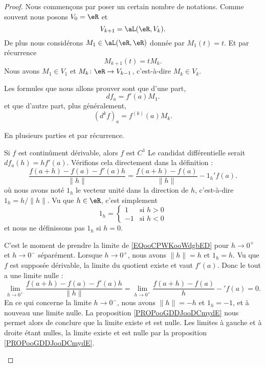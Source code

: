 \begin{proof}
    Nous commençons par poser un certain nombre de notations. Comme souvent nous posons \( V_0=\eR\) et
    \begin{equation}
        V_{k+1}=\aL(\eR,V_k).
    \end{equation}
    De plus nous considérons \( M_1\in \aL(\eR,\eR)\) donnée par \( M_1(t)=t\). Et par récurrence
    \begin{equation}
        M_{k+1}(t)=tM_{k}.
    \end{equation}
    Nous avons \( M_1\in V_1\) et \( M_k\colon \eR\to V_{k-1}\), c'est-à-dire \( M_k\in V_k\).

    Les formules que nous allons prouver sont que d'une part,
    \begin{equation}
        df_a=f'(a)M_1.
    \end{equation}
    et que d'autre part, plus généralement,
    \begin{equation}
        (d^kf)_a=f^{(k)}(a)M_k.
    \end{equation}

    En plusieurs parties et par récurrence.
    \begin{subproof}
    \item[Si \( f\) est continûment dérivable, alors \( f\) est \( C^1\) ]
        Le candidat différentielle serait \( df_a(h)=hf'(a)\). Vérifions cela directement dans la définition :
        \begin{equation}        \label{EQooCPWKooWdgbED}
            \frac{ f(a+h)-f(a)-f'(a)h }{ \| h \| }=\frac{ f(a+h)-f(a) }{ \| h \| }-1_h'f(a).
        \end{equation}
        où nous avons noté \( 1_h\) le vecteur unité dans la direction de \( h\), c'est-à-dire \( 1_h=h/\| h \|\). Vu que \( h\in \eR\), c'est simplement
        \begin{equation}
            1_h=\begin{cases}
                1    &   \text{si } h>0\\
                -1    &    \text{si }h<0
            \end{cases}
        \end{equation}
        et nous ne définissons pas \( 1_h\) si \( h=0\).
        
        C'est le moment de prendre la limite de \eqref{EQooCPWKooWdgbED} pour \( h\to 0^+\) et \( h\to 0^-\) séparément. Lorsque \( h\to 0^+\), nous avons \( \| h \|=h\) et \( 1_h=h\). Vu que \( f\) est supposée dérivable, la limite du quotient existe et vaut \( f'(a)\). Donc le tout a une limite nulle :
        \begin{equation}       
            \lim_{h\to 0^+} \frac{ f(a+h)-f(a)-f'(a)h }{ \| h \| }=\lim_{h\to 0^+}\frac{ f(a+h)-f(a) }{  h  }-'f(a)=0.
        \end{equation}
        En ce qui concerne la limite \( h\to 0^-\), nous avons \( \| h \|=-h\) et \( 1_h=-1\), et à nouveau une limite nulle. La proposition \ref{PROPooGDDJooDCmydE} nous permet alors de conclure que la limite existe et est nulle. Les limites à gauche et à droite étant nulles, la limite existe et est nulle par la proposition \ref{PROPooGDDJooDCmydE}.


\end{subproof}
\end{proof}
